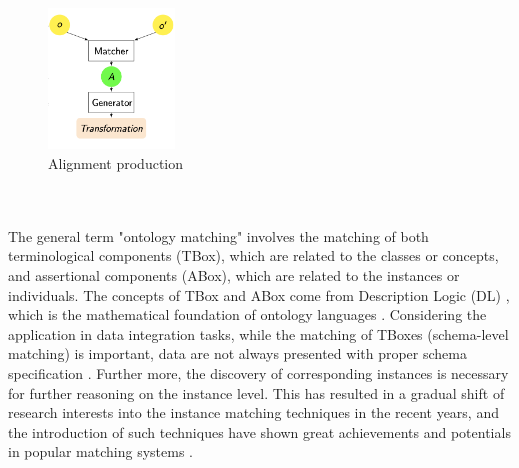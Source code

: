 \begin{figure}[ht]
\begin{center}
\includegraphics[width=0.3\textwidth]{img/ontomatch.png}
\caption{Alignment production}
\label{fig:align}
\end{center}
\end{figure}
\\\\
The general term "ontology matching" involves the matching of both terminological components (TBox), which are related to the classes or concepts, and assertional components (ABox), which are related to the instances or individuals. The concepts of TBox and ABox come from Description Logic (DL) \cite{DBLP:books/daglib/0041477}, which is the mathematical foundation of ontology languages \cite{DBLP:journals/cacm/Horrocks08}. Considering the application in data integration tasks, while the matching of TBoxes (schema-level matching) is important, data are not always presented with proper schema specification \cite{DBLP:conf/boemie/CastanoFMV11}. Further more, the discovery of corresponding instances is necessary for further reasoning on the instance level. This has resulted in a gradual shift of research interests into the instance matching techniques in the recent years, and the introduction of such techniques have shown great achievements and potentials in popular matching systems \cite{DBLP:conf/scdm/AbubakarHMA18}.

